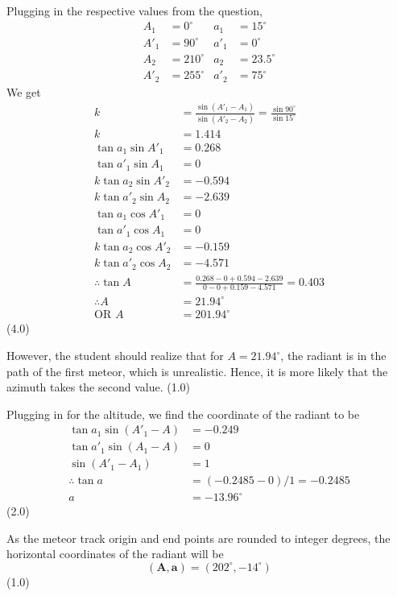 \begin{description}
  Plugging in the respective values from the question,
  \begin{align*}
    A_1 &= 0^\circ  & a_1 &= 15^\circ\\
    A'_1 &= 90^\circ & a'_1 &= 0^\circ\\
    A_2 &= 210^\circ & a_2 &= 23.5^\circ\\
    A'_2 &= 255^\circ & a'_2 &= 75^\circ
  \end{align*}
  We get
  \begin{align*}
    k &= \frac{\sin(A'_1 - A_1)}{\sin(A'_2 - A_2)}
       = \frac{\sin 90^\circ}{\sin 15^\circ}\\
    k &= 1.414\\
    \tan a_1 \sin A'_1 &= 0.268\\
    \tan a'_1 \sin A_1 &= 0\\
    k\tan a_2 \sin A'_2 &= -0.594\\
    k\tan a'_2 \sin A_2 &= -2.639\\
    \tan a_1 \cos A'_1 &= 0\\
    \tan a'_1 \cos A_1 &= 0\\
    k\tan a_2 \cos A'_2 &= -0.159\\
    k\tan a'_2 \cos A_2 &= -4.571\\
    \therefore \tan A &= \frac{0.268 - 0 + 0.594 - 2.639}
                              {0 - 0 + 0.159 - 4.571} = 0.403\\
    \therefore A &= 21.94^\circ\\
    \text{OR } A &= 201.94^\circ
  \end{align*}
  \hfill(4.0)

  However, the student should realize that for $A = 21.94^\circ$, the radiant
  is in the path of the first meteor, which is unrealistic. Hence, it is more
  likely that the azimuth takes the second value. \hfill(1.0)

  Plugging in for the altitude, we find the coordinate of the radiant to be
  \begin{align*}
    \tan a_1 \sin(A'_1 - A) &= -0.249\\
    \tan a'_1 \sin(A_1 - A) &= 0\\
    \sin(A'_1 - A_1) &= 1\\
    \therefore \tan a &= (-0.2485 - 0)/1 = -0.2485\\
    a &= -13.96^\circ
  \end{align*}
  \hfill(2.0)

  As the meteor track origin and end points are rounded to integer degrees,
  the horizontal coordinates of the radiant will be
  \[
    (\mathbf{A}, \mathbf{a}) = (202^\circ, -14^\circ)
  \]
  \hfill(1.0)


\end{description}
